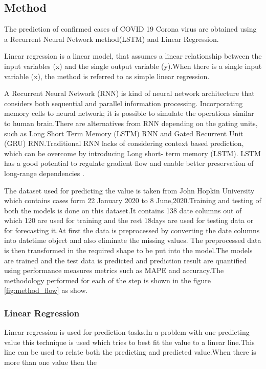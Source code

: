 \subsection{Method}

The prediction of confirmed cases of COVID 19 Corona virus are obtained
using a Recurrent Neural Network method(LSTM) and Linear Regression.

Linear regression is a linear model, that assumes a linear relationship between the input variables
(x) and the single output variable (y).When there is a single input variable (x), the method
is referred to as simple linear regression.

A Recurrent Neural Network (RNN) is kind of neural network architecture that considers
both sequential and parallel information processing. Incorporating memory cells to neural
network; it is possible to simulate the operations similar to human brain.There are
alternatives from RNN depending on the gating units, such as Long Short Term Memory
(LSTM) RNN and Gated Recurrent Unit (GRU) RNN.Traditional RNN lacks of
considering context based prediction, which can be overcome by introducing Long short-
term memory (LSTM). LSTM has a good potential to regulate gradient flow and enable
better preservation of long-range dependencies \cite{bandyopadhyay2020machine}.

The dataset used for predicting the value is taken from John Hopkin University which
contains cases form 22 January 2020 to 8 June,2020.Training and testing of both the models
is done on this dataset.It contains 138 date columns out of which 120 are used for training
and the rest 18days are used for testing data or for forecasting it.At first the data is preprocessed by converting the date columns into datetime object and also eliminate the
missing values. The preprocessed data is then transformed in the required shape to be put
into the model.The models are trained and the test data is predicted and prediction result
are quantified using performance measures metrics such as MAPE and
accuracy.The methodology performed for each of the step is shown in the figure
\ref{fig:method_flow} as show.

\subsubsection{Linear Regression}
Linear regression is used for prediction tasks.In a problem with one predicting value this
technique is used which tries to best fit the value to a linear line.This line can be used to
relate both the predicting and predicted value.When there is more than one value then the

